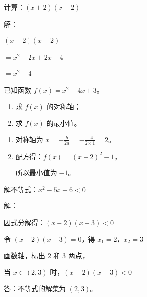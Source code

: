 \documentclass{exam-zh}
\begin{document}
\begin{problem}[points = 8]
  计算：$(x + 2)(x - 2)$

  \begin{solution}
    解：

    $(x + 2)(x - 2)$ 

    $= x^2 - 2x + 2x - 4$ 

    $= x^2 - 4$ 
  \end{solution}
\end{problem}

\begin{problem}[points = 10]
  已知函数 $f(x) = x^2 - 4x + 3$。

  \begin{enumerate}
    \item 求 $f(x)$ 的对称轴；
    \item 求 $f(x)$ 的最小值。
  \end{enumerate}

  \begin{solution}
    \begin{enumerate}
      \item 对称轴为 $x = -\frac{b}{2a} = -\frac{-4}{2 \times 1} = 2$。

      \item 配方得：$f(x) = (x - 2)^2 - 1$，

      所以最小值为 $-1$。
    \end{enumerate}
  \end{solution}
\end{problem}

\begin{problem}[points = 12]
  解不等式：$x^2 - 5x + 6 < 0$

  \begin{solution}
    解：

    因式分解得：$(x - 2)(x - 3) < 0$ 

    令 $(x - 2)(x - 3) = 0$，得 $x_1 = 2$，$x_2 = 3$ 

    画数轴，标出 $2$ 和 $3$ 两点，

    当 $x \in (2, 3)$ 时，$(x - 2)(x - 3) < 0$ 

    答：不等式的解集为 $(2, 3)$。
  \end{solution}
\end{problem}
\end{document}
